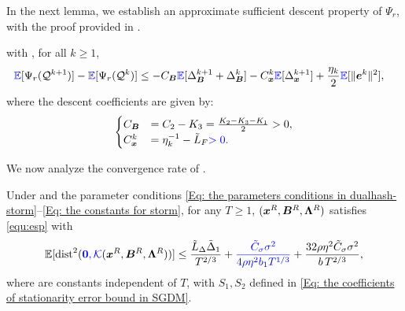In the next lemma, we establish an  approximate sufficient descent property
of $\Psi_r$, with the proof provided in .
\begin{lemma}
\label{Lemma: approximate sufficient descent property storm}
     with , for all $k \geq 1$,
    \begin{align}
        \blue{\EE}[\Psi_r(\mathcal{Q}^{k+1})] - \blue{\EE}[\Psi_r(\mathcal{Q}^{k})]
        &\leq -C_{\bB}\blue{\EE}[\Delta_{\bB}^{k+1}+\Delta_{\bB}^{k}]-C_{\bx}^{k}\blue{\EE}[\Delta_{\bx}^{k+1}]+\frac{\eta_k}{2}\blue{\EE}[\|\be^{k}\|^{2}],
        \label{Eq: the descent property of Lyapunov func in storm}
    \end{align}
    where the descent coefficients are given by:
    \begin{align}
        \begin{cases}C_{\bm{B}}&= C_{2}- K_{3}= \frac{K_2 - K_3 -K_1}{2}>0, \\ C_{\bm{x}}^{k}&=\eta_{k}^{-1}- \tilde{L}_{F} {\color{blue}> 0}.\end{cases} \notag
    \end{align}
\end{lemma}

We now analyze the convergence rate of .
\begin{lemma}
    \label{Lemma: convergence rate of storm} Under  and the parameter conditions \eqref{Eq: the parameters conditions in dualhash-storm}--\eqref{Eq: the constants for storm}, for any $T \geq 1$,  $(\bm{x}^{R}, \bm{B}^{R}, \bm{\Lambda}^{R})$ satisfies \eqref{equ:esp} with
    \begin{align}
    \label{Eq: the convergence rate of storm}\EE[\mathrm{dist}^{2}(\blue{\bm{0}, \mathcal K}(\bx^{R}, \bB^{R}, \bm{\Lambda}^{R}))] \leq \frac{\tilde{L}_{\Delta}\tilde{\Delta}_{1}}{T^{2/3}}+\blue{\frac{\tilde{C}_{\sigma}\sigma^{2}}{4\rho\eta^{2}b_1T^{1/3}}}+\frac{32\rho\eta^{2}\tilde{C}_{\sigma}\sigma^{2}}{b\,T^{2/3}},
    \end{align}
    where
    \blue{\[
    \tilde{L}_{\Delta}:=\max\Bigl\{\frac{S_1}{C_{\bB}},\frac{S_2}{C_{\bB}},\frac{48\tilde{L}_F}{\eta}+\frac{16\eta L_F^{2}(1+3\tau^{2})}{\tilde{L}_F}\Bigr\},\qquad \tilde{C}_{\sigma}:=\frac{\eta\tilde{L}_{\Delta}}{2\tilde{L}_F}
    \]}
    are constants independent of $T$, with $S_1,S_2$ defined in \eqref{Eq: the coefficients of stationarity error bound in SGDM}.
\end{lemma}

